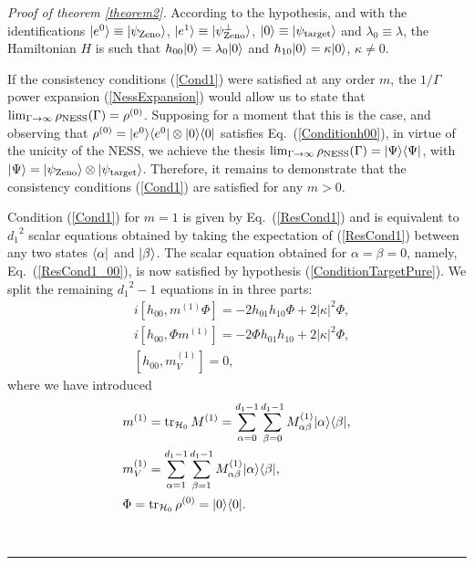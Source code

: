 \documentclass[aps,pra,letterpaper,twocolumn,showpacs,superscriptaddress,floatfix,longbibliography]{revtex4-1}
\newcommand{\traccazero}{\mathop{\mathrm{tr}_{\mathcal{H}_0}}\limits}
\newenvironment{proof}[1][Proof]{\noindent\textit{#1.} }{\
  \rule{0.5em}{0.5em}}
\begin{document}
\begin{proof}[Proof of theorem \ref{theorem2}]
  According to the hypothesis, and with the identifications $|{e^0}\rangle
  \equiv |{\psi_{\rm{Zeno}}}\rangle$, $|{e^1}\rangle \equiv
  |{\psi_{\rm{Zeno}}^\perp}\rangle$, $|{0}\rangle \equiv
  |{\psi_{\rm{target}}}\rangle$ and $\lambda_0 \equiv \lambda$, the
  Hamiltonian $H$ is such that $h_{00} |{0}\rangle = \lambda_0 |{0}\rangle$
  and $h_{10} |{0}\rangle = \kappa |{0}\rangle$, $\kappa \neq 0$.

  If the consistency conditions (\ref{Cond1}) were satisfied at any
  order $m$, the $1/\Gamma$ power expansion (\ref{NessExpansion})
  would allow us to state that $\lim_{\Gamma\to\infty}
  \rho_{\rm{NESS}}(\Gamma) = \rho^{(0)}$.  Supposing for a moment that
  this is the case, and observing that $\rho^{(0)}= |{e^0}\rangle\langle{e^0}|
  \otimes |{0}\rangle\langle{0}|$ satisfies Eq.~(\ref{Conditionh00}), in
  virtue of the unicity of the NESS, we achieve the thesis
  $\lim_{\Gamma\to\infty} \rho_{\rm{NESS}}(\Gamma) =
  |{\Psi}\rangle\langle{\Psi}|$, with $|{\Psi }\rangle = |{\psi_{\rm{Zeno}}}\rangle
  \otimes |{\psi_{\rm{target}}}\rangle$.  Therefore, it remains to
  demonstrate that the consistency conditions (\ref{Cond1}) are
  satisfied for any $m>0$.

  Condition (\ref{Cond1}) for $m=1$ is given by Eq.~(\ref{ResCond1})
  and is equivalent to ${d_1}^2$ scalar equations obtained by taking
  the expectation of (\ref{ResCond1}) between any two states
  $\langle{\alpha}|$ and $|{\beta}\rangle$.  The scalar equation obtained for
  $\alpha=\beta=0$, namely, Eq.~(\ref{ResCond1_00}), is now satisfied
  by hypothesis (\ref{ConditionTargetPure}).  We split the remaining
  ${d_1}^2-1$ equations in in three parts:
  \begin{align}
    &i [h_{00},m^{(1)}\Phi]= -2 h_{01} h_{10} \Phi
    + 2 |\kappa|^2 \Phi, \label{C1-1} \\
    &i [h_{00},\Phi m^{(1)}]= -2 \Phi h_{01} h_{10}
    + 2 |\kappa|^2 \Phi, \label{C1-2} \\
    & [h_{00},m^{(1)}_V]=0, \label{C1-3}
  \end{align}
  where we have introduced
  \begin{align}
    & m^{(1)}=\traccazero M^{(1)}=
    \sum_{\alpha=0}^{d_1-1}\sum_{\beta=0}^{d_1-1} M^{(1)}_{\alpha
      \beta} \ket{\alpha}\bra{\beta}, \\
    &m^{(1)}_V=\sum_{\alpha=1}^{d_1-1}\sum_{\beta=1}^{d_1-1}
    M^{(1)}_{\alpha \beta} \ket{\alpha}\bra{\beta}, \\
    &\Phi= \traccazero \rho^{(0)}=\ket{0}\bra{0}.
  \end{align}


\end{proof}
\end{document}
